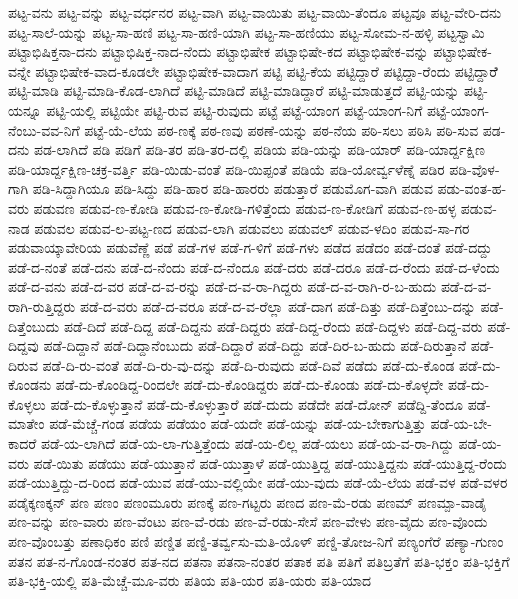ಪಟ್ಟ-ವನು
ಪಟ್ಟ-ವನ್ನು
ಪಟ್ಟ-ವರ್ಧನರ
ಪಟ್ಟ-ವಾಗಿ
ಪಟ್ಟ-ವಾಯಿತು
ಪಟ್ಟ-ವಾಯಿ-ತೆಂದೂ
ಪಟ್ಟವೂ
ಪಟ್ಟ-ವೇರಿ-ದನು
ಪಟ್ಟ-ಸಾಲೆ-ಯನ್ನು
ಪಟ್ಟ-ಸಾ-ಹಣಿ
ಪಟ್ಟ-ಸಾ-ಹಣಿ-ಯಾಗಿ
ಪಟ್ಟ-ಸಾ-ಹಣಿಯು
ಪಟ್ಟ-ಸೋಮ-ನ-ಹಳ್ಳಿ
ಪಟ್ಟಸ್ವಾಮಿ
ಪಟ್ಟಾಭಿಷಿಕ್ತನಾ-ದನು
ಪಟ್ಟಾಭಿಷಿಕ್ತ-ನಾದ-ನೆಂದು
ಪಟ್ಟಾಭಿಷೇಕ
ಪಟ್ಟಾಭಿಷೇ-ಕದ
ಪಟ್ಟಾಭಿಷೇಕ-ವನ್ನು
ಪಟ್ಟಾಭಿಷೇಕ-ವನ್ನೇ
ಪಟ್ಟಾಭಿಷೇಕ-ವಾದ-ಕೂಡಲೇ
ಪಟ್ಟಾಭಿಷೇಕ-ವಾದಾಗ
ಪಟ್ಟಿ
ಪಟ್ಟಿ-ಕೆಯ
ಪಟ್ಟಿದ್ದಾರೆ
ಪಟ್ಟಿದ್ದಾ-ರೆಂದು
ಪಟ್ಟಿದ್ದಾರೆೆ
ಪಟ್ಟಿ-ಮಾಡಿ
ಪಟ್ಟಿ-ಮಾಡಿ-ಕೊಡ-ಲಾಗಿದೆ
ಪಟ್ಟಿ-ಮಾಡಿದೆ
ಪಟ್ಟಿ-ಮಾಡಿದ್ದಾರೆ
ಪಟ್ಟಿ-ಮಾಡುತ್ತದೆ
ಪಟ್ಟಿ-ಯನ್ನು
ಪಟ್ಟಿ-ಯನ್ನೂ
ಪಟ್ಟಿ-ಯಲ್ಲಿ
ಪಟ್ಟಿಯೇ
ಪಟ್ಟಿ-ರುವ
ಪಟ್ಟಿ-ರುವುದು
ಪಟ್ಟೆ
ಪಟ್ಟೆ-ಯಾಂಗ
ಪಟ್ಟೆ-ಯಾಂಗ-ನಿಗೆ
ಪಟ್ಟೆ-ಯಾಂಗ-ನೆಂಬು-ವವ-ನಿಗೆ
ಪಟ್ಟೆ-ಯೆ-ಲೆಯ
ಪಠ-ಣಕ್ಕೆ
ಪಠ-ಣವು
ಪಠಣೆ-ಯನ್ನು
ಪಠ-ನೆಯ
ಪಠಿ-ಸಲು
ಪಠಿಸಿ
ಪಠಿ-ಸುವ
ಪಡ-ದನು
ಪಡ-ಲಾಗಿದೆ
ಪಡಿ
ಪಡಿಗೆ
ಪಡಿ-ತರ
ಪಡಿ-ತರ-ದಲ್ಲಿ
ಪಡಿಯ
ಪಡಿ-ಯನ್ನು
ಪಡಿ-ಯಾರ್
ಪಡಿ-ಯಾರ್ದ್ದಕ್ಷಿಣ
ಪಡಿ-ಯಾರ್ದ್ದಕ್ಷಿಣ-ಚಕ್ರ-ವರ್ತ್ತಿ
ಪಡಿ-ಯಿಡು-ವಂತೆ
ಪಡಿ-ಯಿಪ್ಪಂತೆ
ಪಡಿಯೆ
ಪಡಿ-ಯೋರ್ವ್ವಳೆಣ್ನೆ
ಪಡಿರ
ಪಡಿ-ವೊಳ-ಗಾಗಿ
ಪಡಿ-ಸಿದ್ದಾಗಿಯೂ
ಪಡಿ-ಸಿದ್ದು
ಪಡಿ-ಹಾರ
ಪಡಿ-ಹಾರರು
ಪಡುತ್ತಾರೆ
ಪಡುಮೊಗ-ವಾಗಿ
ಪಡುವ
ಪಡು-ವಂತ-ಹ-ವರು
ಪಡುವಣ
ಪಡುವ-ಣ-ಕೋಡಿ
ಪಡುವ-ಣ-ಕೋಡಿ-ಗಳಿತ್ತೆಂದು
ಪಡುವ-ಣ-ಕೋಡಿಗೆ
ಪಡುವ-ಣ-ಹಳ್ಳ
ಪಡುವ-ನಾಡ
ಪಡುವಲ
ಪಡುವ-ಲ-ಪಟ್ಟ-ಣದ
ಪಡುವ-ಲಾಗಿ
ಪಡುವಲು
ಪಡುವಲ್
ಪಡುವ-ಳದಿಂ
ಪಡುವ-ಸಾ-ಗರ
ಪಡುವಾಯ್ಕಾವೇರಿಯ
ಪಡುವೆಣ್ಣೆ
ಪಡೆ
ಪಡೆ-ಗಳ
ಪಡೆ-ಗ-ಳಿಗೆ
ಪಡೆ-ಗಳು
ಪಡೆದ
ಪಡೆದಂ
ಪಡೆ-ದಂತೆ
ಪಡೆ-ದದ್ದು
ಪಡೆ-ದ-ನಂತೆ
ಪಡೆ-ದನು
ಪಡೆ-ದ-ನೆಂದು
ಪಡೆ-ದ-ನೆಂದೂ
ಪಡೆ-ದರು
ಪಡೆ-ದರೂ
ಪಡೆ-ದ-ರೆಂದು
ಪಡೆ-ದ-ಳೆಂದು
ಪಡೆ-ದ-ವನು
ಪಡೆ-ದ-ವರ
ಪಡೆ-ದ-ವ-ರನ್ನು
ಪಡೆ-ದ-ವ-ರಾ-ಗಿದ್ದರು
ಪಡೆ-ದ-ವ-ರಾಗಿ-ರ-ಬ-ಹುದು
ಪಡೆ-ದ-ವ-ರಾಗಿ-ರುತ್ತಿದ್ದರು
ಪಡೆ-ದ-ವರು
ಪಡೆ-ದ-ವರೂ
ಪಡೆ-ದ-ವ-ರೆಲ್ಲಾ
ಪಡೆ-ದಾಗ
ಪಡೆ-ದಿತ್ತು
ಪಡೆ-ದಿತ್ತೆಂಬು-ದನ್ನು
ಪಡೆ-ದಿತ್ತೆಂಬುದು
ಪಡೆ-ದಿದೆ
ಪಡೆ-ದಿದ್ದ
ಪಡೆ-ದಿದ್ದನು
ಪಡೆ-ದಿದ್ದರು
ಪಡೆ-ದಿದ್ದ-ರೆಂದು
ಪಡೆ-ದಿದ್ದಳು
ಪಡೆ-ದಿದ್ದ-ವರು
ಪಡೆ-ದಿದ್ದವು
ಪಡೆ-ದಿದ್ದಾನೆ
ಪಡೆ-ದಿದ್ದಾನೆಂಬುದು
ಪಡೆ-ದಿದ್ದಾರೆ
ಪಡೆ-ದಿದ್ದು
ಪಡೆ-ದಿರ-ಬ-ಹುದು
ಪಡೆ-ದಿರುತ್ತಾನೆ
ಪಡೆ-ದಿರುವ
ಪಡೆ-ದಿ-ರು-ವಂತೆ
ಪಡೆ-ದಿ-ರು-ವು-ದನ್ನು
ಪಡೆ-ದಿ-ರುವುದು
ಪಡೆ-ದಿವೆ
ಪಡೆದು
ಪಡೆ-ದು-ಕೊಂಡ
ಪಡೆ-ದು-ಕೊಂಡನು
ಪಡೆ-ದು-ಕೊಂಡಿದ್ದ-ರಿಂದಲೇ
ಪಡೆ-ದು-ಕೊಂಡಿದ್ದರು
ಪಡೆ-ದು-ಕೊಂಡು
ಪಡೆ-ದು-ಕೊಳ್ಳದೇ
ಪಡೆ-ದು-ಕೊಳ್ಳಲು
ಪಡೆ-ದು-ಕೊಳ್ಳುತ್ತಾನೆ
ಪಡೆ-ದು-ಕೊಳ್ಳುತ್ತಾರೆ
ಪಡೆ-ದುದು
ಪಡೆದೇ
ಪಡೆ-ದೋನ್
ಪಡೆದ್ದಿ-ತೆಂದೂ
ಪಡೆ-ಮಾತೇಂ
ಪಡೆ-ಮೆಚ್ಚೆ-ಗಂಡ
ಪಡೆಯ
ಪಡೆಯಂ
ಪಡೆ-ಯದೇ
ಪಡೆ-ಯನ್ನು
ಪಡೆ-ಯ-ಬೇಕಾಗುತ್ತಿತ್ತು
ಪಡೆ-ಯ-ಬೇ-ಕಾದರೆ
ಪಡೆ-ಯ-ಲಾಗಿದೆ
ಪಡೆ-ಯ-ಲಾ-ಗುತ್ತಿತ್ತೆಂದು
ಪಡೆ-ಯ-ಲಿಲ್ಲ
ಪಡೆ-ಯಲು
ಪಡೆ-ಯ-ವ-ರಾ-ಗಿದ್ದು
ಪಡೆ-ಯ-ವರು
ಪಡೆ-ಯಿತು
ಪಡೆಯು
ಪಡೆ-ಯುತ್ತಾನೆ
ಪಡೆ-ಯುತ್ತಾಳೆ
ಪಡೆ-ಯುತ್ತಿದ್ದ
ಪಡೆ-ಯುತ್ತಿದ್ದನು
ಪಡೆ-ಯುತ್ತಿದ್ದ-ರೆಂದು
ಪಡೆ-ಯುತ್ತಿದ್ದು-ದ-ರಿಂದ
ಪಡೆ-ಯುವ
ಪಡೆ-ಯು-ವಲ್ಲಿಯೇ
ಪಡೆ-ಯು-ವುದು
ಪಡೆ-ಯೆ-ಲೆಯ
ಪಡೆ-ವಳ
ಪಡೆ-ವಳರ
ಪಡೈಕ್ಕಣಕ್ಕನ್
ಪಣ
ಪಣಂ
ಪಣಂಮೂರು
ಪಣಕ್ಕೆ
ಪಣ-ಗಟ್ಟರು
ಪಣದ
ಪಣ-ಮೆ-ರಡು
ಪಣಮ್
ಪಣಮ್ಪಾ-ವಾಡೈ
ಪಣ-ವನ್ನು
ಪಣ-ವಾರು
ಪಣ-ವೆಂಟು
ಪಣ-ವೆ-ರಡು
ಪಣ-ವೆ-ರಡು-ಸೇಸೆ
ಪಣ-ವೇಳು
ಪಣ-ವೈದು
ಪಣ-ವೊಂದು
ಪಣ-ವೊಂಬತ್ತು
ಪಣಾಧಿಕಂ
ಪಣಿ
ಪಣ್ಡಿತ
ಪಣ್ಡಿ-ತರ್ವ್ವಸು-ಮತಿ-ಯೊಳ್
ಪಣ್ಡಿ-ತೋಜ-ನಿಗೆ
ಪಣ್ಯಂಗೆರೆ
ಪಣ್ಯಾ-ಗುಣಂ
ಪತನ
ಪತ-ನ-ಗೊಂಡ-ನಂತರ
ಪತ-ನದ
ಪತನಾ
ಪತನಾ-ನಂತರ
ಪತಾಕ
ಪತಿ
ಪತಿಗೆ
ಪತಿಬ್ರತೆಗೆ
ಪತಿ-ಭಕ್ತಂ
ಪತಿ-ಭಕ್ತಿಗೆ
ಪತಿ-ಭಕ್ತಿ-ಯಲ್ಲಿ
ಪತಿ-ಮೆಚ್ಚೆ-ಮೂ-ವರು
ಪತಿಯ
ಪತಿ-ಯರ
ಪತಿ-ಯರು
ಪತಿ-ಯಾದ

